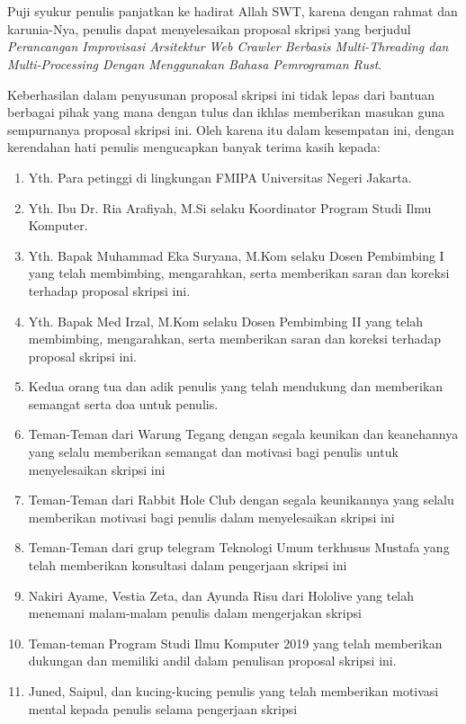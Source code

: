 \chapter*{}
\onehalfspacing{}
Puji syukur penulis panjatkan ke hadirat Allah SWT, karena dengan rahmat dan
karunia-Nya, penulis dapat menyelesaikan proposal skripsi yang berjudul
\textit{Perancangan Improvisasi Arsitektur Web Crawler Berbasis Multi-Threading dan Multi-Processing Dengan Menggunakan Bahasa Pemrograman Rust}.

Keberhasilan dalam penyusunan proposal skripsi ini tidak lepas dari bantuan
berbagai pihak yang mana dengan tulus dan ikhlas memberikan masukan guna
sempurnanya proposal skripsi ini. Oleh karena itu dalam kesempatan ini, dengan
kerendahan hati penulis mengucapkan banyak terima kasih kepada:

\begin{enumerate}

	\item{Yth. Para petinggi di lingkungan FMIPA Universitas Negeri Jakarta.}
	\item{Yth. Ibu Dr. Ria Arafiyah, M.Si selaku Koordinator Program Studi Ilmu
		Komputer.}
	\item{Yth. Bapak Muhammad Eka Suryana, M.Kom selaku Dosen Pembimbing I yang
		telah membimbing, mengarahkan, serta memberikan saran dan koreksi terhadap
		proposal skripsi ini.}
	\item{Yth. Bapak Med Irzal, M.Kom selaku Dosen Pembimbing II yang telah
		membimbing, mengarahkan, serta memberikan saran dan koreksi terhadap
		proposal skripsi ini.}
	\item{Kedua orang tua dan adik penulis yang telah mendukung dan memberikan 
		semangat serta doa untuk penulis.}
  \item{Teman-Teman dari Warung Tegang dengan segala keunikan dan keanehannya yang 
    selalu memberikan semangat dan motivasi bagi penulis untuk menyelesaikan 
    skripsi ini}
  \item{Teman-Teman dari Rabbit Hole Club dengan segala keunikannya yang selalu
    memberikan motivasi bagi penulis dalam menyelesaikan skripsi ini}
  \item{Teman-Teman dari grup telegram Teknologi Umum terkhusus Mustafa yang telah 
    memberikan konsultasi dalam pengerjaan skripsi ini}
	\item{Nakiri Ayame, Vestia Zeta, dan Ayunda Risu dari Hololive yang telah 
    menemani malam-malam penulis dalam mengerjakan skripsi}
	\item{Teman-teman Program Studi Ilmu Komputer 2019 yang telah memberikan 
		dukungan dan memiliki andil dalam penulisan proposal skripsi ini.}
	\item{Juned, Saipul, dan kucing-kucing penulis yang telah memberikan motivasi
    mental kepada penulis selama pengerjaan skripsi}
	
\end{enumerate}

